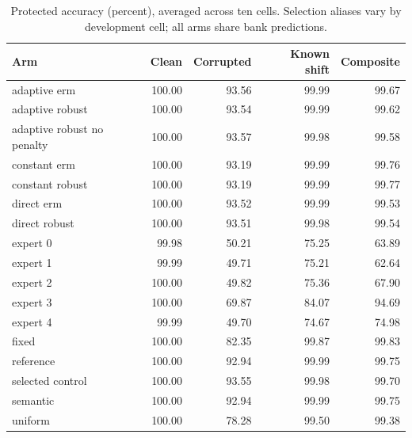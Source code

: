\begin{table}[ht]\centering\small
\caption{Protected accuracy (percent), averaged across ten cells. Selection aliases vary by development cell; all arms share bank predictions.}
\begin{tabular}{lrrrr}\toprule
Arm & Clean & Corrupted & Known shift & Composite \\\midrule
adaptive erm & 100.00 & 93.56 & 99.99 & 99.67 \\
adaptive robust & 100.00 & 93.54 & 99.99 & 99.62 \\
adaptive robust no penalty & 100.00 & 93.57 & 99.98 & 99.58 \\
constant erm & 100.00 & 93.19 & 99.99 & 99.76 \\
constant robust & 100.00 & 93.19 & 99.99 & 99.77 \\
direct erm & 100.00 & 93.52 & 99.99 & 99.53 \\
direct robust & 100.00 & 93.51 & 99.98 & 99.54 \\
expert 0 & 99.98 & 50.21 & 75.25 & 63.89 \\
expert 1 & 99.99 & 49.71 & 75.21 & 62.64 \\
expert 2 & 100.00 & 49.82 & 75.36 & 67.90 \\
expert 3 & 100.00 & 69.87 & 84.07 & 94.69 \\
expert 4 & 99.99 & 49.70 & 74.67 & 74.98 \\
fixed & 100.00 & 82.35 & 99.87 & 99.83 \\
reference & 100.00 & 92.94 & 99.99 & 99.75 \\
selected control & 100.00 & 93.55 & 99.98 & 99.70 \\
semantic & 100.00 & 92.94 & 99.99 & 99.75 \\
uniform & 100.00 & 78.28 & 99.50 & 99.38 \\
\bottomrule\end{tabular}\end{table}
